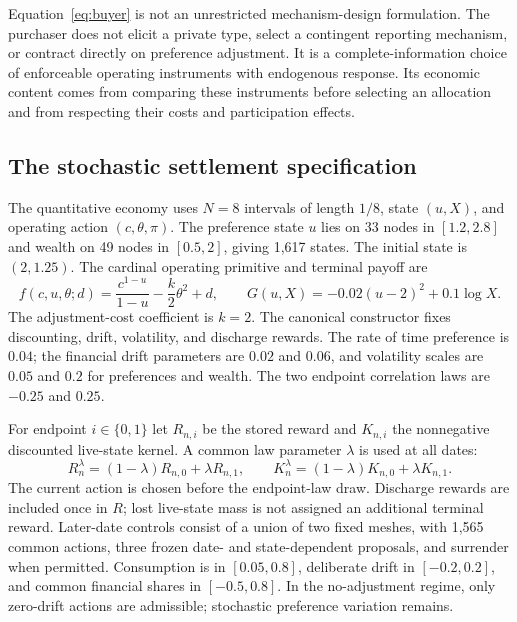Equation~\eqref{eq:buyer} is not an unrestricted mechanism-design formulation. The purchaser does not elicit a private type, select a contingent reporting mechanism, or contract directly on preference adjustment. It is a complete-information choice of enforceable operating instruments with endogenous response. Its economic content comes from comparing these instruments before selecting an allocation and from respecting their costs and participation effects.

\subsection{The stochastic settlement specification}
The quantitative economy uses $N=8$ intervals of length $1/8$, state $(u,X)$, and operating action $(c,\theta,\pi)$. The preference state $u$ lies on 33 nodes in $[1.2,2.8]$ and wealth on 49 nodes in $[0.5,2]$, giving 1,617 states. The initial state is $(2,1.25)$. The cardinal operating primitive and terminal payoff are
\begin{equation}
 f(c,u,\theta;d)=\frac{c^{1-u}}{1-u}-\frac{k}{2}\theta^2+d,
 \qquad G(u,X)=-0.02(u-2)^2+0.1\log X.
 \label{eq:primitives}
\end{equation}
The adjustment-cost coefficient is $k=2$. The canonical constructor fixes discounting, drift, volatility, and discharge rewards. The rate of time preference is $0.04$; the financial drift parameters are $0.02$ and $0.06$, and volatility scales are $0.05$ and $0.2$ for preferences and wealth. The two endpoint correlation laws are $-0.25$ and $0.25$.

For endpoint $i\in\{0,1\}$ let $R_{n,i}$ be the stored reward and $K_{n,i}$ the nonnegative discounted live-state kernel. A common law parameter $\lambda$ is used at all dates:
\begin{equation}
 R_n^\lambda=(1-\lambda)R_{n,0}+\lambda R_{n,1},\qquad
 K_n^\lambda=(1-\lambda)K_{n,0}+\lambda K_{n,1}.
 \label{eq:mixture}
\end{equation}
The current action is chosen before the endpoint-law draw. Discharge rewards are included once in $R$; lost live-state mass is not assigned an additional terminal reward. Later-date controls consist of a union of two fixed meshes, with 1,565 common actions, three frozen date- and state-dependent proposals, and surrender when permitted. Consumption is in $[0.05,0.8]$, deliberate drift in $[-0.2,0.2]$, and common financial shares in $[-0.5,0.8]$. In the no-adjustment regime, only zero-drift actions are admissible; stochastic preference variation remains.

